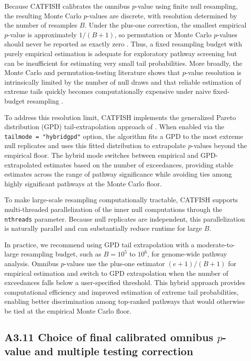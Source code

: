 \documentclass[unnumsec,webpdf,contemporary,large]{oup-authoring-template}%
\theoremstyle{thmstyleone}%
\theoremstyle{thmstyletwo}%
\theoremstyle{thmstylethree}%
\begin{document}
\begin{appendices}
Because CATFISH calibrates the omnibus $p$-value using finite null resampling, the resulting Monte Carlo $p$-values are discrete, with resolution determined by the number of resamples $B$. Under the plus-one correction, the smallest empirical $p$-value is approximately $1/(B+1)$, so permutation or Monte Carlo $p$-values should never be reported as exactly zero \citep{Phipson2010}. Thus, a fixed resampling budget with purely empirical estimation is adequate for exploratory pathway screening but can be insufficient for estimating very small tail probabilities. More broadly, the Monte Carlo and permutation-testing literature shows that $p$-value resolution is intrinsically limited by the number of null draws and that reliable estimation of extreme tails quickly becomes computationally expensive under naive fixed-budget resampling \citep{Knijnenburg2009,Che2014}.

To address this resolution limit, CATFISH implements the generalized Pareto distribution (GPD) tail-extrapolation approach of \citet{Knijnenburg2009}. When enabled via the \texttt{tailmode = "hybridgpd"} option, the algorithm fits a GPD to the most extreme null replicates and uses this fitted distribution to extrapolate $p$-values beyond the empirical floor. The hybrid mode switches between empirical and GPD-extrapolated estimates based on the number of exceedances, providing stable estimates across the range of pathway significance while avoiding ties among highly significant pathways at the Monte Carlo floor.

To make large-scale resampling computationally tractable, CATFISH supports multi-threaded parallelization of the inner null computations through the \texttt{nthreads} parameter. Because null replicates are independent, this parallelization is naturally parallel and can substantially reduce runtime for large $B$.

In practice, we recommend using GPD tail extrapolation with a moderate-to-large resampling budget, such as $B=10^5$ to $10^6$, for genome-wide pathway analysis. Omnibus $p$-values use the plus-one estimator $(e+1)/(B+1)$ for empirical estimation and switch to GPD extrapolation when the number of exceedances falls below a user-specified threshold. This hybrid approach provides computational efficiency and improved estimation of extreme tail probabilities, enabling better discrimination among top-ranked pathways that would otherwise be tied at the empirical Monte Carlo floor.

\subsection{A3.11 Choice of final calibrated omnibus \texorpdfstring{$p$}{p}-value and multiple testing correction}


\end{appendices}
\end{document}
